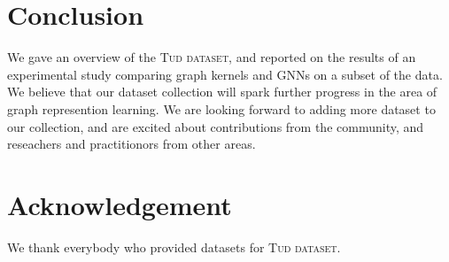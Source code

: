 \documentclass{article}
\theoremstyle{definition}
\begin{document}
\begin{table}[t]\centering		
	\caption{Results for neural and kernel baselines.}
	\label{t2l}	
\end{table}		



\section{Conclusion}

We gave an overview of the \textsc{Tud dataset}, and reported on the results of an experimental study comparing graph kernels and GNNs on a subset of the data. We believe that our dataset collection will spark further progress in the area of graph represention learning. We are looking forward to adding more dataset to our collection, and are excited about contributions from the community, and reseachers and practitionors from other areas.


\section{Acknowledgement}

We thank everybody who provided datasets for \textsc{Tud dataset}.




\appendix
\end{document}
